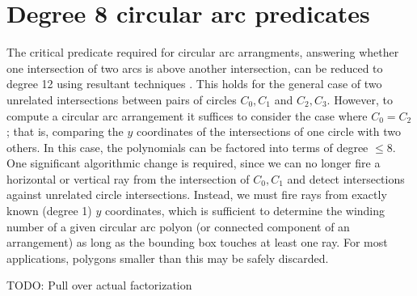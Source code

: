 \documentclass[11pt]{article}
\newcommand{\TODO}{{\color{red} TODO}}
\begin{document}
\section{Degree 8 circular arc predicates} \label{sec:predicates}

The critical predicate required for circular arc arrangments, answering whether one intersection of two arcs is above another intersection,
can be reduced to degree 12 using resultant techniques \cite{devillers2000algebraic}.  This holds for the general case of two unrelated intersections between pairs of circles
$C_0,C_1$ and $C_2,C_3$.  However, to compute a circular arc arrangement it suffices to consider the case where $C_0 = C_2$; that is, comparing the $y$ coordinates of the
intersections of one circle with two others.  In this case, the polynomials can be factored into terms of degree $\le 8$.  One significant algorithmic change is required,
since we can no longer fire a horizontal or vertical ray from the intersection of $C_0,C_1$ and detect intersections against unrelated circle intersections.  Instead, we must fire
rays from exactly known (degree 1) $y$ coordinates, which is sufficient to determine the winding number of a given circular arc polyon (or connected component of an arrangement)
as long as the bounding box touches at least one ray.  For most applications, polygons smaller than this may be safely discarded.

\TODO: Pull over actual factorization
\end{document}
